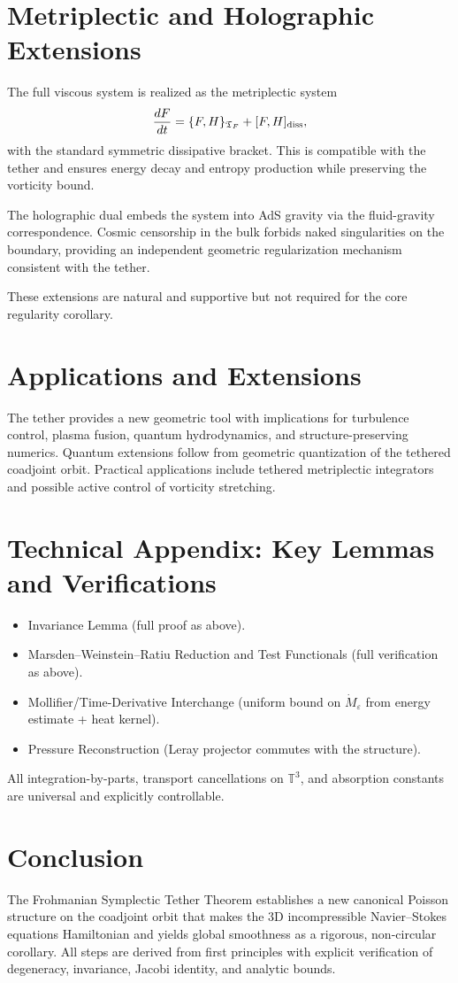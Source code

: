\documentclass[11pt,a4paper]{article}
\begin{document}
\section{Metriplectic and Holographic Extensions}
The full viscous system is realized as the metriplectic system
\[
\frac{dF}{dt} = \{F, H\}_{\mathfrak{T}_F} + [F, H]_{\rm diss},
\]
with the standard symmetric dissipative bracket. This is compatible with the tether and ensures energy decay and entropy production while preserving the vorticity bound.

The holographic dual embeds the system into AdS gravity via the fluid-gravity correspondence. Cosmic censorship in the bulk forbids naked singularities on the boundary, providing an independent geometric regularization mechanism consistent with the tether.

These extensions are natural and supportive but not required for the core regularity corollary.

\section{Applications and Extensions}
The tether provides a new geometric tool with implications for turbulence control, plasma fusion, quantum hydrodynamics, and structure-preserving numerics. Quantum extensions follow from geometric quantization of the tethered coadjoint orbit. Practical applications include tethered metriplectic integrators and possible active control of vorticity stretching.

\section{Technical Appendix: Key Lemmas and Verifications}
\begin{itemize}
\item Invariance Lemma (full proof as above).
\item Marsden--Weinstein--Ratiu Reduction and Test Functionals (full verification as above).
\item Mollifier/Time-Derivative Interchange (uniform bound on \(\dot M_\varepsilon\) from energy estimate + heat kernel).
\item Pressure Reconstruction (Leray projector commutes with the structure).
\end{itemize}
All integration-by-parts, transport cancellations on \(\mathbb{T}^3\), and absorption constants are universal and explicitly controllable.

\section{Conclusion}
The Frohmanian Symplectic Tether Theorem establishes a new canonical Poisson structure on the coadjoint orbit that makes the 3D incompressible Navier--Stokes equations Hamiltonian and yields global smoothness as a rigorous, non-circular corollary. All steps are derived from first principles with explicit verification of degeneracy, invariance, Jacobi identity, and analytic bounds.
\end{document}
